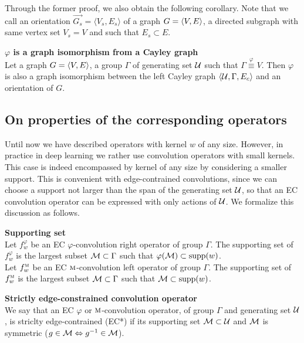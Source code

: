 Through the former proof, we also obtain the following corollary. Note that we call an orientation $\vec{G_s} = \langle V_s, E_s \rangle$ of a graph $G = \langle V, E \rangle$, a directed subgraph with same vertex set $V_s = V$ and such that $E_s \subset E$.

\begin{corollary}\textbf{$\varphi$ is a graph isomorphism from a Cayley graph}\\
Let a graph $G = \langle V, E \rangle$, a group $\Gamma$ of generating set $\mathcal{U}$ such that $\Gamma \overset\varphi\equiv V$. Then $\varphi$ is also a graph isomorphism between the left Cayley graph $\langle \mathcal{U}, \Gamma, E_c \rangle$ and an orientation of $G$.
\label{cor:giso}
\end{corollary}

\subsection{On properties of the corresponding operators}
\label{sec:ec}

Until now we have described operators with kernel $w$ of any size. However, in practice in deep learning we rather use convolution operators with small kernels. This case is indeed encompassed by kernel of any size by considering a smaller support. This is convenient with edge-contrained convolutions, since we can choose a support not larger than the span of the generating set $\mathcal{U}$, so that an EC convolution operator can be expressed with only actions of $\mathcal{U}$.
We formalize this discussion as follows.

\begin{definition}\textbf{Supporting set}\\
Let $f_w^\varphi$ be an EC $\varphi$-convolution right operator of group $\Gamma$. The supporting set of $f_w^\varphi$ is the largest subset $\mathcal{M} \subset \Gamma$ such that $\varphi(\mathcal{M}) \subset \operatorname{supp}(w)$.\\
Let $f_w^{\operatorname{\textsc{m}}}$ be an EC $\operatorname{\textsc{m}}$-convolution left operator of group $\Gamma$. The supporting set of $f_w^{\operatorname{\textsc{m}}}$ is the largest subset $\mathcal{M} \subset \Gamma$ such that $\mathcal{M} \subset \operatorname{supp}(w)$.
\end{definition}

\begin{definition}\textbf{Strictly edge-constrained convolution operator}\\
We say that an EC $\varphi$ or $\operatorname{\textsc{m}}$-convolution operator, of group $\Gamma$ and generating set $\mathcal{U}$, is striclty edge-contrained (EC*) if its supporting set $\mathcal{M} \subset \mathcal{U}$ and $\mathcal{M}$ is symmetric (\ie $g \in \mathcal{M} \Leftrightarrow g^{-1} \in \mathcal{M}$).
\end{definition}

